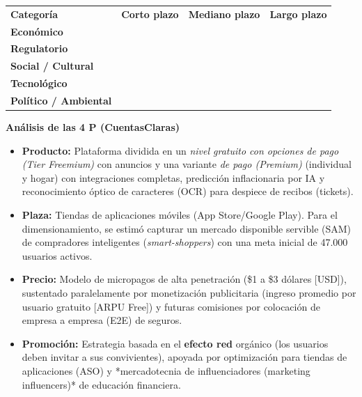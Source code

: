 \newpage

\begin{table}[h!]
\centering
\renewcommand{\arraystretch}{1.5}
\begin{tabularx}{\textwidth}{|l|X|X|X|}
\hline
\rowcolor{red!20} \multicolumn{4}{|c|}{\textbf{CONTEXTO}} \\ \hline
\rowcolor{red!10} \textbf{Categoría} & \textbf{Corto plazo} & \textbf{Mediano plazo} & \textbf{Largo plazo} \\ \hline
\textbf{Económico} & \cellcolor{green!50} & \cellcolor{orange!50} & \cellcolor{green!50} \\ \hline
\textbf{Regulatorio} & \cellcolor{green!50} & \cellcolor{green!50} & \cellcolor{green!50} \\ \hline
\textbf{Social / Cultural} & \cellcolor{orange!50} & \cellcolor{green!50} & \cellcolor{green!50} \\ \hline
\textbf{Tecnológico} & \cellcolor{green!50} & \cellcolor{green!50} & \cellcolor{green!50} \\ \hline
\textbf{Político / Ambiental} & \cellcolor{green!50} & \cellcolor{orange!50} & \cellcolor{green!50} \\ \hline
\end{tabularx}
\end{table}

\textbf{Análisis de las 4 P (CuentasClaras)}

\begin{itemize}
    \item \textbf{Producto:} Plataforma dividida en un \textit{nivel gratuito con opciones de pago (Tier Freemium)} con anuncios y una variante \textit{de pago (Premium)} (individual y hogar) con integraciones completas, predicción inflacionaria por IA y reconocimiento óptico de caracteres (OCR) para despiece de recibos (tickets).
    \item \textbf{Plaza:} Tiendas de aplicaciones móviles (App Store/Google Play). Para el dimensionamiento, se estimó capturar un mercado disponible servible (SAM) de compradores inteligentes (\textit{smart-shoppers}) con una meta inicial de 47.000 usuarios activos.
    \item \textbf{Precio:} Modelo de micropagos de alta penetración (\$1 a \$3 dólares [USD]), sustentado paralelamente por monetización publicitaria (ingreso promedio por usuario gratuito [ARPU Free]) y futuras comisiones por colocación de empresa a empresa (E2E) de seguros.
    \item \textbf{Promoción:} Estrategia basada en el \textbf{efecto red} orgánico (los usuarios deben invitar a sus convivientes), apoyada por optimización para tiendas de aplicaciones (ASO) y *mercadotecnia de influenciadores (marketing influencers)* de educación financiera.
\end{itemize}

